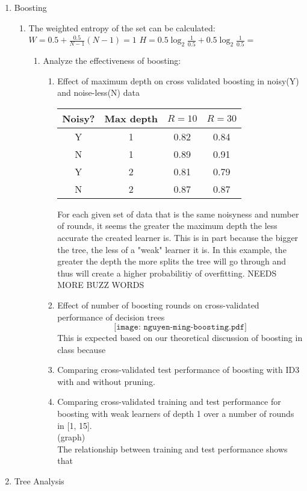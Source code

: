 \documentclass[11pt]{article}
\begin{document}
\begin{enumerate}
\item Boosting
\begin{enumerate}
	\item The weighted entropy of the set can be calculated:\\
	$W=0.5 + \frac{0.5}{N-1}(N-1) = 1$
	$H = 0.5\log_2 \frac{1}{0.5} + 0.5\log_2 \frac{1}{0.5} =$ 
	\begin{enumerate} 
	\item Analyze the effectiveness of boosting:
		\begin{enumerate}
			\item Effect of maximum depth on cross validated boosting in noisy(Y) and noise-less(N) data
				\begin{center}
				\begin{tabular}{|c|c|c|c|}
				\hline
				Noisy? & Max depth & $R = 10$ & $R = 30$\\ \hline
				Y & 1 & 0.82 & 0.84\\ \hline
				N & 1 & 0.89 & 0.91\\ \hline
				Y & 2 & 0.81 & 0.79 \\ \hline
				N & 2 & 0.87 & 0.87\\
				\hline
				\end{tabular}
				\end{center}
			For each given set of data that is the same noisyness and number of rounds, it seems the greater the maximum depth the less accurate the created learner is. This is in part because the bigger the tree, the less of a "weak" learner it is. In this example, the greater the depth the more splits the tree will go through and thus will create a higher probabilitiy of overfitting. NEEDS MORE BUZZ WORDS
			\item Effect of number of boosting rounds on cross-validated performance of decision trees
			 $$\texttt{[image: nguyen-ming-boosting.pdf]}$$
			This is expected based on our theoretical discussion of boosting in class because
			\item Comparing cross-validated test performance of boosting with ID3 with and without pruning.
			\item Comparing cross-validated training and test performance for boosting with weak learners of depth 1 over a number of rounds in [1, 15].\\
			(graph)\\
			The relationship between training and test performance shows that
		\end{enumerate}
	\end{enumerate}
\end{enumerate}

\item Tree Analysis

\end{enumerate}
\end{document}
